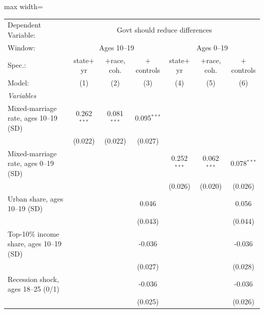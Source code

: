       \begin{adjustbox}{max width=\linewidth}
   \begin{tabular}{lcccccc}
      \tabularnewline \midrule \midrule
      Dependent Variable: & \multicolumn{6}{c}{Govt should reduce differences}\\
      Window: & \multicolumn{3}{c}{Ages 10--19} & \multicolumn{3}{c}{Ages 0--19} \\ 
      Spec.:                                   & state$+$yr    & $+$race, coh. & $+$controls   & state$+$yr    & $+$race, coh. & $+$controls \\   
      Model:                                   & (1)           & (2)           & (3)           & (4)           & (5)           & (6)\\  
      \midrule
      \emph{Variables}\\
      Mixed-marriage rate, ages 10--19 (SD)    & 0.262$^{***}$ & 0.081$^{***}$ & 0.095$^{***}$ &               &               &   \\   
                                               & (0.022)       & (0.022)       & (0.027)       &               &               &   \\   
      Mixed-marriage rate, ages 0--19 (SD)     &               &               &               & 0.252$^{***}$ & 0.062$^{***}$ & 0.078$^{***}$\\   
                                               &               &               &               & (0.026)       & (0.020)       & (0.026)\\   
      Urban share, ages 10--19 (SD)            &               &               & 0.046         &               &               & 0.056\\   
                                               &               &               & (0.043)       &               &               & (0.044)\\   
      Top-10\% income share, ages 10--19 (SD)  &               &               & -0.036        &               &               & -0.036\\   
                                               &               &               & (0.027)       &               &               & (0.028)\\   
      Recession shock, ages 18--25 (0/1)       &               &               & -0.036        &               &               & -0.036\\   
                                               &               &               & (0.025)       &               &               & (0.026)\\   

\end{tabular}
\end{adjustbox}
